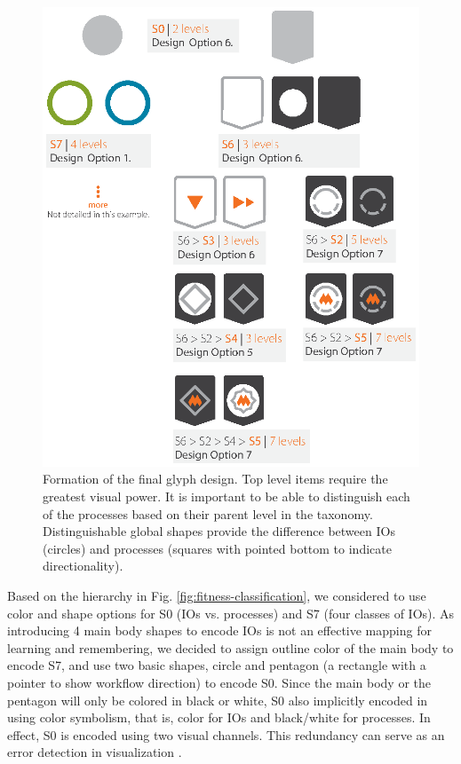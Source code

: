 \begin{figure}[t!]
\centering
\includegraphics[scale=0.7]{images/glyph-taxonomy/glyph-design-selection.eps}
\caption{Formation of the final glyph design. Top level items require the greatest visual power. It is important to be able to distinguish each of the processes based on their parent level in the taxonomy. Distinguishable global shapes provide the difference between IOs (circles) and processes (squares with pointed bottom to indicate directionality).}
\label{fig:glyph-design-selection}
\vspace{-10pt}
\end{figure}

Based on the hierarchy in Fig. \ref{fig:fitness-classification}, we considered to use color and shape options for S0 (IOs vs. processes) and S7 (four classes of IOs).
As introducing 4 main body shapes to encode IOs is not an effective mapping for learning and remembering, we decided to assign outline color of the main body to encode S7, and use two basic shapes, circle and pentagon (a rectangle with a pointer to show workflow direction) to encode S0.
Since the main body or the pentagon will only be colored in black or white, S0 also implicitly encoded in using color symbolism, that is, color for IOs and black/white for processes.
In effect, S0 is encoded using two visual channels.
This redundancy can serve as an error detection in visualization \cite{Chen10}.

